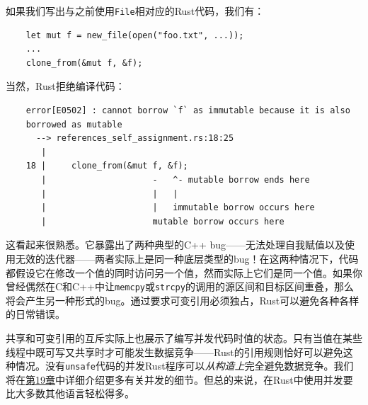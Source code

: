如果我们写出与之前使用\texttt{File}相对应的Rust代码，我们有：
\begin{verbatim}
    let mut f = new_file(open("foo.txt", ...));
    ...
    clone_from(&mut f, &f);
\end{verbatim}

当然，Rust拒绝编译代码：
\begin{verbatim}
    error[E0502] : cannot borrow `f` as immutable because it is also 
    borrowed as mutable 
      --> references_self_assignment.rs:18:25
       |
    18 |     clone_from(&mut f, &f);
       |                     -   ^- mutable borrow ends here 
       |                     |   |
       |                     |   immutable borrow occurs here 
       |                     mutable borrow occurs here
\end{verbatim}

这看起来很熟悉。它暴露出了两种典型的C++ bug——无法处理自我赋值以及使用无效的迭代器——两者实际上是同一种底层类型的bug！在这两种情况下，代码都假设它在修改一个值的同时访问另一个值，然而实际上它们是同一个值。如果你曾经偶然在C和C++中让\texttt{memcpy}或\texttt{strcpy}的调用的源区间和目标区间重叠，那么将会产生另一种形式的bug。通过要求可变引用必须独占，Rust可以避免各种各样的日常错误。

共享和可变引用的互斥实际上也展示了编写并发代码时值的状态。只有当值在某些线程中既可写又共享时才可能发生数据竞争——Rust的引用规则恰好可以避免这种情况。没有\texttt{unsafe}代码的并发Rust程序可以\emph{从构造上}完全避免数据竞争。我们将在\hyperref[ch19]{第19章}中详细介绍更多有关并发的细节。但总的来说，在Rust中使用并发要比大多数其他语言轻松得多。

\clearpage

